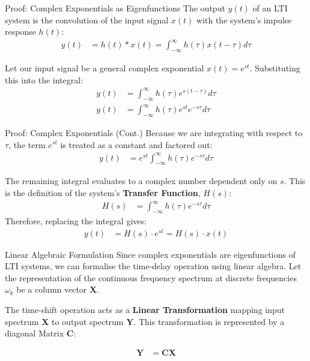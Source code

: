 \documentclass{beamer}
\theoremstyle{remark}
\numberwithin{equation}{section}
\begin{document}
\begin{frame}{Proof: Complex Exponentials as Eigenfunctions}
The output $y(t)$ of an LTI system is the convolution of the input signal $x(t)$ with the system's impulse response $h(t)$:
\begin{align}
    y(t) &= h(t) * x(t) = \int_{-\infty}^{\infty} h(\tau) x(t - \tau) d\tau
\end{align}

Let our input signal be a general complex exponential $x(t) = e^{st}$. Substituting this into the integral:
\begin{align}
    y(t) &= \int_{-\infty}^{\infty} h(\tau) e^{s(t - \tau)} d\tau \\
    y(t) &= \int_{-\infty}^{\infty} h(\tau) e^{st} e^{-s\tau} d\tau
\end{align}
\end{frame}

\begin{frame}{Proof: Complex Exponentials (Cont.)}
Because we are integrating with respect to $\tau$, the term $e^{st}$ is treated as a constant and factored out:
\begin{align}
    y(t) &= e^{st} \int_{-\infty}^{\infty} h(\tau) e^{-s\tau} d\tau
\end{align}

The remaining integral evaluates to a complex number dependent only on $s$. This is the definition of the system's \textbf{Transfer Function}, $H(s)$:
\begin{align}
    H(s) &= \int_{-\infty}^{\infty} h(\tau) e^{-s\tau} d\tau
\end{align}
Therefore, replacing the integral gives:
\begin{align}
    y(t) &= H(s) \cdot e^{st} = H(s) \cdot x(t)
\end{align}
\end{frame}

\begin{frame}{Linear Algebraic Formulation}
Since complex exponentials are eigenfunctions of LTI systems, we can formalise the time-delay operation using linear algebra. Let the representation of the continuous frequency spectrum at discrete frequencies $\omega_k$ be a column vector $\mathbf{X}$.
\vspace{0.5cm}

The time-shift operation acts as a \textbf{Linear Transformation} mapping input spectrum $\mathbf{X}$ to output spectrum $\mathbf{Y}$. This transformation is represented by a diagonal Matrix $\mathbf{C}$:

\begin{align}
    \mathbf{Y} &= \mathbf{C} \mathbf{X}
\end{align}
\end{frame}
\end{document}
